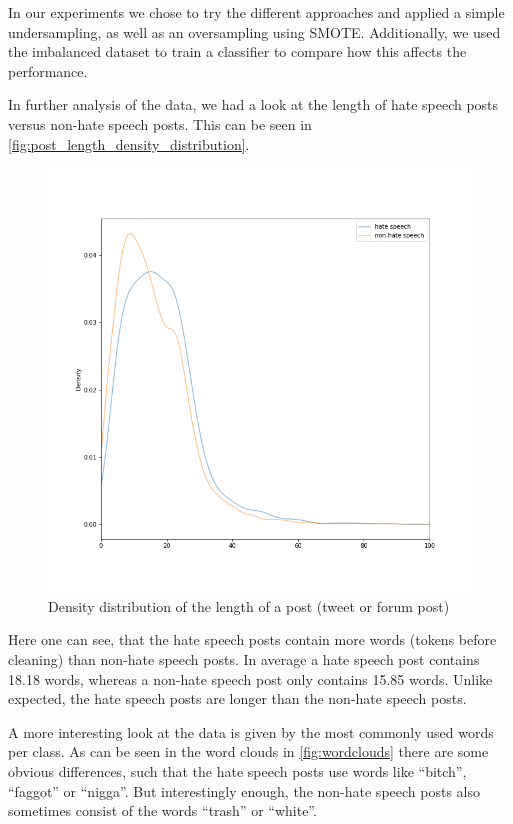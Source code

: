 In our experiments we chose to try the different approaches and applied a simple undersampling, as well as an oversampling using SMOTE. Additionally, we used the imbalanced dataset to train a classifier to compare how this affects the performance.

\vspace{1cm}

In further analysis of the data, we had a look at the length of hate speech posts versus non-hate speech posts. This can be seen in \autoref{fig:post_length_density_distribution}.

\begin{figure}[ht]
    \centering
    \includegraphics[width=0.8\linewidth]{figures/post_length_density_distribution.png}
    \caption{Density distribution of the length of a post (tweet or forum post)}
    \label{fig:post_length_density_distribution}
\end{figure}

Here one can see, that the hate speech posts contain more words (tokens before cleaning) than non-hate speech posts. In average a hate speech post contains 18.18 words, whereas a non-hate speech post only contains 15.85 words. Unlike expected, the hate speech posts are longer than the non-hate speech posts.

A more interesting look at the data is given by the most commonly used words per class. As can be seen in the word clouds in \autoref{fig:wordclouds} there are some obvious differences, such that the hate speech posts use words like \enquote{bitch}, \enquote{faggot} or \enquote{nigga}. But interestingly enough, the non-hate speech posts also sometimes consist of the words \enquote{trash} or \enquote{white}.

